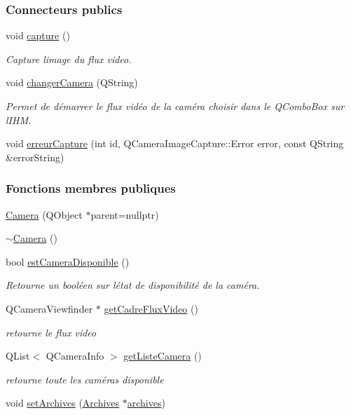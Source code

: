 \subsubsection*{Connecteurs publics}
\begin{DoxyCompactItemize}
\item 
void \hyperlink{class_camera_a3ca730dcbd7ea6bfba12931a15066f6c}{capture} ()
\begin{DoxyCompactList}\small\item\em Capture l\textquotesingle{}image du flux video. \end{DoxyCompactList}\item 
void \hyperlink{class_camera_a82a0dd06f1802dc0ec0ea8ff6fcbd231}{changer\+Camera} (Q\+String)
\begin{DoxyCompactList}\small\item\em Permet de démarrer le flux vidéo de la caméra choisir dans le Q\+Combo\+Box sur l\textquotesingle{}I\+HM. \end{DoxyCompactList}\item 
void \hyperlink{class_camera_ac5b8c16f8edcb92569fab87185fc0500}{erreur\+Capture} (int id, Q\+Camera\+Image\+Capture\+::\+Error error, const Q\+String \&error\+String)
\end{DoxyCompactItemize}
\subsubsection*{Fonctions membres publiques}
\begin{DoxyCompactItemize}
\item 
\hyperlink{class_camera_ae3aa4afd7a3d9ddc2bf710bc74dc293e}{Camera} (Q\+Object $\ast$parent=nullptr)
\item 
\hyperlink{class_camera_ad1897942d0ccf91052386388a497349f}{$\sim$\+Camera} ()
\item 
bool \hyperlink{class_camera_afb73ab859802a143a1a00443e396143e}{est\+Camera\+Disponible} ()
\begin{DoxyCompactList}\small\item\em Retourne un booléen sur l\textquotesingle{}état de disponibilité de la caméra. \end{DoxyCompactList}\item 
Q\+Camera\+Viewfinder $\ast$ \hyperlink{class_camera_a67420d3ef14065a412327ada6193a2e0}{get\+Cadre\+Flux\+Video} ()
\begin{DoxyCompactList}\small\item\em retourne le flux video \end{DoxyCompactList}\item 
Q\+List$<$ Q\+Camera\+Info $>$ \hyperlink{class_camera_ad8a2a21d3701375a553c7c90646c694f}{get\+Liste\+Camera} ()
\begin{DoxyCompactList}\small\item\em retourne toute les caméras disponible \end{DoxyCompactList}\item 
void \hyperlink{class_camera_a66b844eec2b721a6ac23b80cb3fe2426}{set\+Archives} (\hyperlink{class_archives}{Archives} $\ast$\hyperlink{class_camera_a5eb3a29aeeab2f2755d0b69ac7cf550a}{archives})
\end{DoxyCompactItemize}
